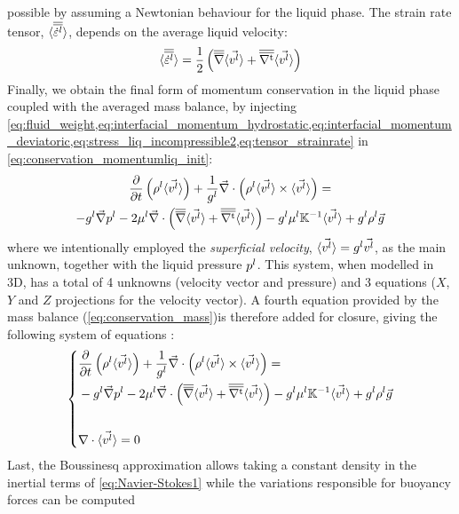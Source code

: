 possible by assuming a Newtonian behaviour for the liquid phase. The strain rate tensor, $\langle {\overline{\overline{\dot{\varepsilon}^l}}} \rangle$, depends on 
the average liquid velocity:
\begin{align}
\label{eq:tensor_strainrate}
\langle {\overline{\overline{\dot{\varepsilon}^l}}} \rangle = \frac{1}{2} \left( {\overline{\overline{\nabla}}} \langle \vec{v^l} \rangle  +  {\overline{\overline{\nabla^\text{t}}}} \langle \vec{v^l} \rangle \right)
\end{align}
Finally, we obtain the final form of momentum conservation in the liquid phase coupled with the averaged mass balance, by injecting \cref{eq:fluid_weight,eq:interfacial_momentum_hydrostatic,eq:interfacial_momentum_deviatoric,eq:stress_liq_incompressible2,eq:tensor_strainrate}
in \cref{eq:conservation_momentumliq_init}:
\begin{multline}
\label{eq:conservation_momentumliq}
 \frac{\partial}{\partial t} \left(  \rho^l \langle \vec{v^l} \rangle  \right)  + \frac{1}{{g^l}} \vec{\nabla} \cdot \left( \rho^l \langle \vec{v^l} \rangle \times \langle \vec{v^l} \rangle \right) = \\
	  - {g^l}\vec{\nabla} {p^l} - 2 \mu^l \vec{\nabla} \cdot \left( {\overline{\overline{\nabla}}} \langle \vec{v^l} \rangle + {\overline{\overline{\nabla^\text{t}}}} \langle \vec{v^l} \rangle \right)
	  - {g^l} \mu^l \mathbb{K}^{-1} \langle \vec{v^l} \rangle + {g^l} \rho^l \vec{g}
\end{multline}
where we intentionally employed the \emph{superficial velocity}, $\langle \vec{v^l} \rangle = {g^l} \vec{v^l}$, as the main unknown, together with the liquid pressure ${p^l}$.
This system, when modelled in 3D, has a total of 4 unknowns (velocity vector and pressure) and 3 equations ($X$,$Y$ and $Z$ projections for the velocity vector).
A fourth equation provided by the mass balance (\cref{eq:conservation_mass})is therefore added for closure, giving the following system of equations :
\begin{equation}
\label{eq:Navier-Stokes1}
   \left\{
   \begin{aligned}
      & \frac{\partial}{\partial t} \left(  \rho^l \langle \vec{v^l} \rangle  \right)  + \frac{1}{{g^l}} \vec{\nabla} \cdot \left( \rho^l \langle \vec{v^l} \rangle \times \langle \vec{v^l} \rangle \right) = \\
	  &- {g^l}\vec{\nabla} {p^l} - 2 \mu^l \vec{\nabla} \cdot \left( {\overline{\overline{\nabla}}} \langle \vec{v^l} \rangle + {\overline{\overline{\nabla^\text{t}}}} \langle \vec{v^l} \rangle \right)
	  - {g^l} \mu^l \mathbb{K}^{-1} \langle \vec{v^l} \rangle + {g^l} \rho^l \vec{g}\\ \\
      & \nabla \cdot \langle \vec{v^l} \rangle =0
    \end{aligned}
    \right.
\end{equation}
Last, the Boussinesq approximation allows taking a constant density in the inertial terms of \cref{eq:Navier-Stokes1} while the variations responsible for buoyancy forces can be computed
